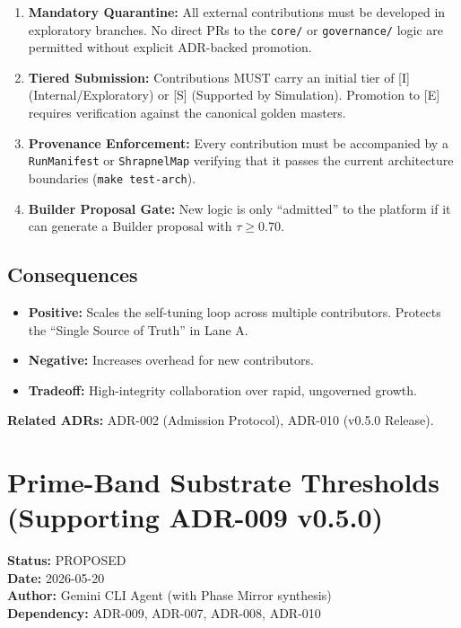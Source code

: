 \documentclass[11pt]{article}
\begin{document}
\begin{enumerate}
    \item \textbf{Mandatory Quarantine:} All external contributions must be developed in exploratory branches. No direct PRs to the \texttt{core/} or \texttt{governance/} logic are permitted without explicit ADR-backed promotion.
    \item \textbf{Tiered Submission:} Contributions MUST carry an initial tier of [I] (Internal/Exploratory) or [S] (Supported by Simulation). Promotion to [E] requires verification against the canonical golden masters.
    \item \textbf{Provenance Enforcement:} Every contribution must be accompanied by a \texttt{RunManifest} or \texttt{ShrapnelMap} verifying that it passes the current architecture boundaries (\texttt{make test-arch}).
    \item \textbf{Builder Proposal Gate:} New logic is only ``admitted'' to the platform if it can generate a Builder proposal with $\tau \ge 0.70$.
\end{enumerate}

\subsection{Consequences}
\begin{itemize}
    \item \textbf{Positive:} Scales the self-tuning loop across multiple contributors. Protects the ``Single Source of Truth'' in Lane A.
    \item \textbf{Negative:} Increases overhead for new contributors.
    \item \textbf{Tradeoff:} High-integrity collaboration over rapid, ungoverned growth.
\end{itemize}

\textbf{Related ADRs:} ADR-002 (Admission Protocol), ADR-010 (v0.5.0 Release).

\section{Prime-Band Substrate Thresholds (Supporting ADR-009 v0.5.0)}
\textbf{Status:} PROPOSED \\
\textbf{Date:} 2026-05-20 \\
\textbf{Author:} Gemini CLI Agent (with Phase Mirror synthesis) \\
\textbf{Dependency:} ADR-009, ADR-007, ADR-008, ADR-010
\end{document}
